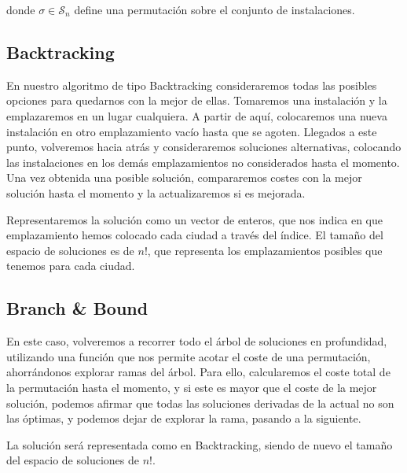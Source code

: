 \documentclass[a4paper, 11pt]{article} %
\begin{document}
	    donde $\sigma \in \mathcal{S}_n$ define una permutación sobre el conjunto de instalaciones.

        
	  \subsection{Backtracking}
	    En nuestro algoritmo de tipo Backtracking consideraremos todas las posibles opciones para quedarnos con la mejor de ellas.
	    Tomaremos una instalación y la emplazaremos en un lugar cualquiera. A partir de aquí, colocaremos una nueva instalación
	    en otro emplazamiento vacío hasta que se agoten. Llegados a este punto, volveremos hacia atrás y consideraremos soluciones
	    alternativas, colocando las instalaciones en los demás emplazamientos no considerados hasta el momento. Una vez obtenida una
	    posible solución, compararemos costes con la mejor solución hasta el momento y la actualizaremos si es mejorada.       
	    
	    Representaremos la solución como un vector de enteros, que nos indica en que emplazamiento hemos colocado cada ciudad a 
	    través del índice. El tamaño del espacio de soluciones es de $n!$, que representa los emplazamientos posibles que tenemos 
	    para cada ciudad. 
	  
	  \subsection{Branch \& Bound}
	    En este caso, volveremos a recorrer todo el árbol de soluciones en profundidad, utilizando una función que nos permite acotar el
	    coste de una permutación, ahorrándonos explorar ramas del árbol. Para ello, calcularemos el coste total de la permutación hasta el 
	    momento, y si este es mayor que el coste de la mejor solución, podemos afirmar que todas las soluciones derivadas de la actual no 
	    son las óptimas, y podemos dejar de explorar la rama, pasando a la siguiente. 
	    
	    La solución será representada como en Backtracking, siendo de nuevo el tamaño del espacio de soluciones de $n!$.
	  
        
        
    
\end{document}
